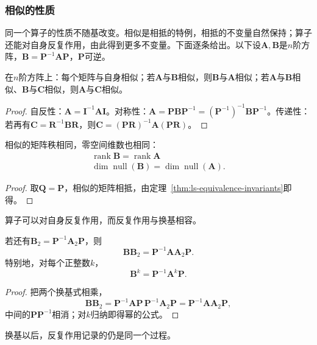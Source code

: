 \subsubsection{相似的性质}
\label{sec:ls-similarity-properties}
同一个算子的性质不随基改变。相似是相抵的特例，相抵的不变量自然保持；算子还能对自身反复作用，由此得到更多不变量。下面逐条给出。以下设$\bm A,\bm B$是$n$阶方阵，$\bm B=\bm P^{-1}\bm A\bm P$，$\bm P$可逆。
\begin{theorem}[相似是等价关系]
\label{thm:ls-similarity-relation}
在$n$阶方阵上：每个矩阵与自身相似；若$\bm A$与$\bm B$相似，则$\bm B$与$\bm A$相似；若$\bm A$与$\bm B$相似、$\bm B$与$\bm C$相似，则$\bm A$与$\bm C$相似。
\end{theorem}
\begin{proof}
自反性：$\bm A=\bm I^{-1}\bm A\bm I$。对称性：$\bm A=\bm P\bm B\bm P^{-1}=(\bm P^{-1})^{-1}\bm B\bm P^{-1}$。传递性：若再有$\bm C=\bm R^{-1}\bm B\bm R$，则$\bm C=(\bm P\bm R)^{-1}\bm A(\bm P\bm R)$。
\end{proof}

\begin{theorem}[相似保持秩]
\label{thm:ls-similarity-invariants}
相似的矩阵秩相同，零空间维数也相同：
\begin{equation}
\begin{gathered}
\operatorname{rank}\bm B=\operatorname{rank}\bm A\\
\dim\operatorname{null}(\bm B)=\dim\operatorname{null}(\bm A).
\end{gathered}
\label{eq:ls-similarity-invariants}
\end{equation}
\end{theorem}
\begin{proof}
取$\bm Q=\bm P$，相似的矩阵相抵，由定理~\ref{thm:ls-equivalence-invariants}即得。
\end{proof}

算子可以对自身反复作用，而反复作用与换基相容。
\begin{theorem}[乘积与幂的换基]
\label{thm:ls-similarity-powers}
若还有$\bm B_2=\bm P^{-1}\bm A_2\bm P$，则
\begin{equation}
 \bm B\bm B_2=\bm P^{-1}\bm A\bm A_2\bm P.
 \label{eq:ls-similarity-product}
\end{equation}
特别地，对每个正整数$k$，
\[
 \bm B^k=\bm P^{-1}\bm A^k\bm P.
\]
\end{theorem}
\begin{proof}
把两个换基式相乘，
\[
 \bm B\bm B_2=\bm P^{-1}\bm A\bm P\,\bm P^{-1}\bm A_2\bm P=\bm P^{-1}\bm A\bm A_2\bm P,
\]
中间的$\bm P\bm P^{-1}$相消；对$k$归纳即得幂的公式。
\end{proof}
换基以后，反复作用记录的仍是同一个过程。

